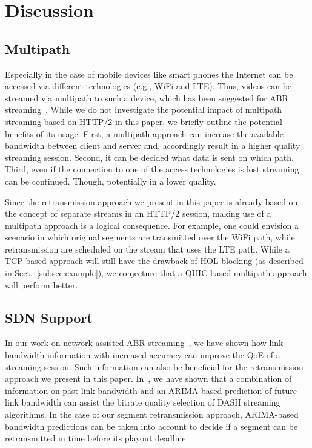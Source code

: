 \section{Discussion}
\label{sec:dicsussion}

\subsection{Multipath}
\label{sec:mpath}
Especially in the case of mobile devices like smart phones the Internet can be accessed via different technologies (e.g., WiFi and LTE). Thus, videos can be streamed via multipath to such a device, which has been suggested for ABR streaming~\cite{Han:CoNEXT:2016}. While we do not investigate the potential impact of multipath streaming based on HTTP/2 in this paper, we briefly outline the potential benefits of its usage. First, a multipath approach can increase the available bandwidth between client and server and, accordingly result in a higher quality streaming session. Second, it can be decided what data is sent on which path. Third, even if the connection to one of the access technologies is lost streaming can be continued. Though, potentially in a lower quality.

Since the retransmission approach we present in this paper is already based on the concept of separate streams in an HTTP/2 session, making use of a multipath approach is a logical consequence. For example, one could envision a scenario in which original segments are transmitted over the WiFi path, while retransmission are scheduled on the stream that uses the LTE path. While a TCP-based approach will still have the drawback of HOL blocking (as described in Sect.~\ref{subsec:example}), we conjecture that a QUIC-based multipath approach will perform better.

\subsection{SDN Support}
\label{subsec:sdn}
In our work on network assisted ABR streaming~\cite{Bhat:MMSys:2017}, we have shown how link bandwidth information with increased accuracy can improve the QoE of a streaming session. Such information can also be beneficial for the retransmission approach we present in this paper. In~\cite{Bhat:MMSys:2017}, we have shown that a combination of information on past link bandwidth and an ARIMA-based prediction of future link bandwidth can assist the bitrate quality selection of DASH streaming algorithms. In the case of our segment retransmission approach, ARIMA-based bandwidth predictions can be taken into account to decide if a segment can be retransmitted in time before its playout deadline.